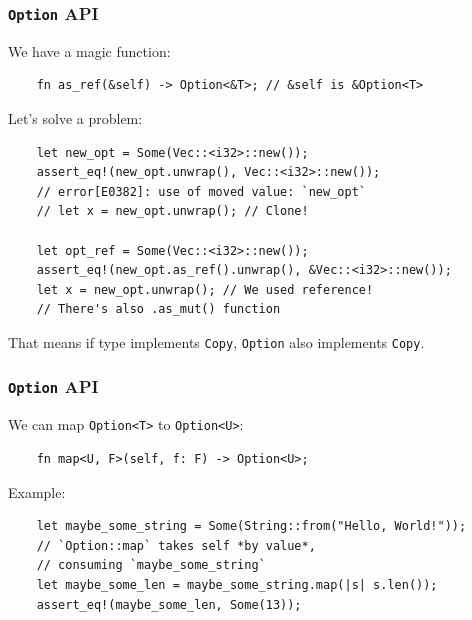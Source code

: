 \documentclass[aspectratio=1610,t]{beamer}
\begin{document}

\begin{frame}[fragile]
\frametitle{\texttt{Option} API}
We have a magic function: \begin{verbatim}
    fn as_ref(&self) -> Option<&T>; // &self is &Option<T>
\end{verbatim}

Let's solve a problem:

\begin{verbatim}
    let new_opt = Some(Vec::<i32>::new());
    assert_eq!(new_opt.unwrap(), Vec::<i32>::new());
    // error[E0382]: use of moved value: `new_opt`
    // let x = new_opt.unwrap(); // Clone!

    let opt_ref = Some(Vec::<i32>::new());
    assert_eq!(new_opt.as_ref().unwrap(), &Vec::<i32>::new());
    let x = new_opt.unwrap(); // We used reference!
    // There's also .as_mut() function
\end{verbatim}

That means if type implements \texttt{Copy}, \texttt{Option} also implements \texttt{Copy}.
\end{frame}
 

\begin{frame}[fragile]
\frametitle{\texttt{Option} API}
We can map \texttt{Option<T>} to \texttt{Option<U>}:

\begin{verbatim}
    fn map<U, F>(self, f: F) -> Option<U>;
\end{verbatim}

Example:

\begin{verbatim}
    let maybe_some_string = Some(String::from("Hello, World!"));
    // `Option::map` takes self *by value*,
    // consuming `maybe_some_string`
    let maybe_some_len = maybe_some_string.map(|s| s.len());
    assert_eq!(maybe_some_len, Some(13));
\end{verbatim}
\end{frame}

\end{document}
